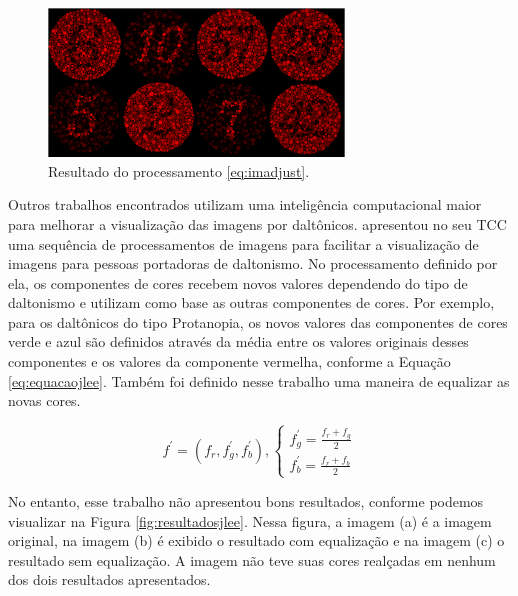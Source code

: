 \documentclass[	12pt, Times, openright, twoside, a4paper, english, brazil]{abntex2}
\begin{document}
\begin{figure}[!htb]
\centering \includegraphics[width=0.7\textwidth]{figuraMatlab3.PNG}
\caption{Resultado do processamento \ref{eq:imadjust}. \label{fig:figuraMatlab3}}
\end{figure}


Outros trabalhos encontrados utilizam uma inteligência computacional maior para melhorar a visualização das imagens por daltônicos.  apresentou no seu TCC uma sequência de processamentos de imagens para facilitar a visualização de imagens para pessoas portadoras de daltonismo. No processamento definido por ela, os componentes de cores recebem novos valores dependendo do tipo de daltonismo e utilizam como base as outras componentes de cores. Por exemplo, para os daltônicos do tipo Protanopia, os novos valores das componentes de cores verde e azul são definidos através da média entre os valores originais desses componentes e os valores da componente vermelha, conforme a Equação \ref{eq:equacaojlee}. Também foi definido nesse trabalho uma maneira de equalizar as novas cores.

\begin{equation}
f^\prime =  (f_r, f_g^\prime, f_b^\prime), \left\{\begin{array}{rc}
f_g^\prime = \frac{f_r + f_g}{2}\\
f_b^\prime = \frac{f_r + f_b}{2}
\end{array}\right.
\label{eq:equacaojlee}
\end{equation}

No entanto, esse trabalho não apresentou bons resultados, conforme podemos visualizar na Figura \ref{fig:resultadosjlee}. Nessa figura, a imagem (a) é a imagem original, na imagem (b) é exibido o resultado com equalização e na imagem (c) o resultado sem equalização. A imagem não teve suas cores realçadas em nenhum dos dois resultados apresentados.
\end{document}
